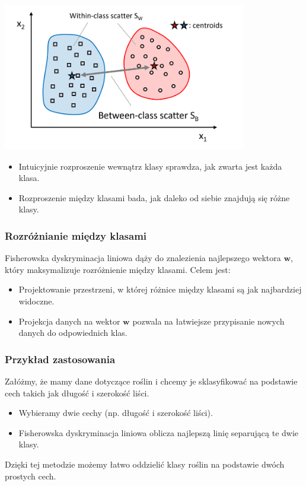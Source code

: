 \documentclass{beamer}
\begin{document}
\begin{frame}
    \includegraphics[width=0.8\textwidth]{rys.png}
    
    \bigskip
    \begin{itemize}
        \item Intuicyjnie rozproszenie wewnątrz klasy sprawdza, jak zwarta jest każda klasa.
        \item Rozproszenie między klasami bada, jak daleko od siebie znajdują się różne klasy.
    \end{itemize}
\end{frame}



\begin{frame}
    \frametitle{Rozróżnianie między klasami}
    Fisherowska dyskryminacja liniowa dąży do znalezienia najlepszego wektora \( \mathbf{w} \), który maksymalizuje rozróżnienie między klasami. Celem jest:
    \begin{itemize}
        \item Projektowanie przestrzeni, w której różnice między klasami są jak najbardziej widoczne.
        \item Projekcja danych na wektor \( \mathbf{w} \) pozwala na łatwiejsze przypisanie nowych danych do odpowiednich klas.
    \end{itemize}
\end{frame}



\begin{frame}
    \frametitle{Przykład zastosowania}
    Załóżmy, że mamy dane dotyczące roślin i chcemy je sklasyfikować na podstawie cech takich jak długość i szerokość liści. 
    \begin{itemize}
        \item Wybieramy dwie cechy (np. długość i szerokość liści).
        \item Fisherowska dyskryminacja liniowa oblicza najlepszą linię separującą te dwie klasy.
    \end{itemize}
    
    Dzięki tej metodzie możemy łatwo oddzielić klasy roślin na podstawie dwóch prostych cech.
\end{frame}
\end{document}
